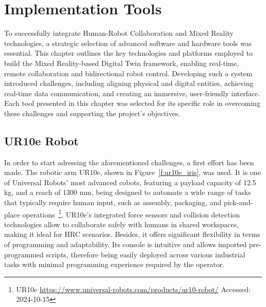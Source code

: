 

\chapter{Implementation Tools}%
\label{chapter:tools}



\begin{introduction}
    To successfully integrate Human-Robot Collaboration and Mixed Reality technologies, a strategic selection of advanced software and hardware tools was essential. This chapter outlines the key technologies and platforms employed to build the Mixed Reality-based Digital Twin framework, enabling real-time, remote collaboration and bidirectional robot control. Developing such a system introduced challenges, including aligning physical and digital entities, achieving real-time data communication, and creating an immersive, user-friendly interface. Each tool presented in this chapter was selected for its specific role in overcoming these challenges and supporting the project’s objectives.
\end{introduction}

\section{UR10e Robot}

In order to start adressing the aforementioned challenges, a first effort has been made. The robotic arm UR10e, shown in Figure~\ref{f:ur10e_iris}, was used. It is one of Universal Robots' most advanced cobots, featuring a payload capacity of 12.5 kg, and a reach of 1300 mm, being designed to automate a wide range of tasks that typically require human input, such as assembly, packaging, and pick-and-place operations~\footnote{UR10e \url{https://www.universal-robots.com/products/ur10-robot/} Accessed: 2024-10-15}. UR10e's integrated force sensors and collision detection technologies allow to collaborate safely with humans in shared workspaces, making it ideal for \ac{HRC} scenarios. Besides, it offers significant flexibility in terms of programming and adaptability. Its console is intuitive and allows imported pre-programmed scripts, therefore being easily deployed across various industrial tasks with minimal programming experience required by the operator.

